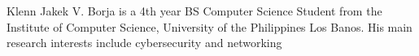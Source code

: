 \documentclass[journal]{./IEEEtran}
\begin{document}



\begin{biography}{Klenn Jakek V. Borja}
is a 4th year BS Computer
Science Student from the Institute of Computer Science, University of the Philippines Los Banos. His main research interests include cybersecurity and networking
\end{biography}
\end{document}
